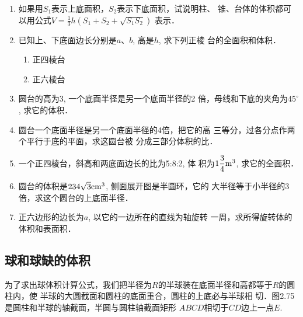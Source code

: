 \begin{ex}
\begin{enumerate}
    \item 如果用$S_1$表示上底面积，$S_2$表示下底面积，试说明柱、
    锥、台体的体积都可以用公式$V=\frac{1}{3}h\left(S_1+S_2+\sqrt{S_1S_2}\right)$
    表示．
    \item 
    已知上、下底面边长分别是$a$、$b$, 高是$h$, 求下列正棱
    台的全面积和体积．
\begin{multicols}{2}
\begin{enumerate}
    \item 正四棱台
    \item 正六棱台
\end{enumerate}
\end{multicols}
    \item 圆台的高为3, 一个底面半径是另一个底面半径的2
    倍，母线和下底的夹角为$45^{\circ}$, 求它的体积．
    \item 圆台一个底面半径是另一个底面半径的4倍，把它的高
    三等分，过各分点作两个平行于底的平面，求这圆台被
    分成三部分体积的比．
    \item 一个正四棱台，斜高和两底面边长的比为5:8:2, 体
    积为$1\frac{3}{4}{\rm m^3}$, 求它的全面积．
    \item 
    圆台的体积是$234\sqrt{3}{\rm cm^3}$, 侧面展开图是半圆环，它的
    大半径等于小半径的3倍，求这个圆台的上底面半径．
    \item 
    正六边形的边长为$a$, 以它的一边所在的直线为轴旋转
    一周，求所得旋转体的体积和表面积．
\end{enumerate}
\end{ex}

\subsection{球和球缺的体积}

为了求出球体积计算公式，我们把半径为$R$的半球装在底面半径和高都等于$R$的圆柱内，使
半球的大圆截面和圆柱的底面重合，圆柱的上底必与半球相
切．图2.75是圆柱和半球的轴截面，半圆与圆柱轴截面矩形
$ABCD$相切于$CD$边上一点$E$.

\begin{figure}[htp]
    \centering
{}
    \caption{}
\end{figure}

